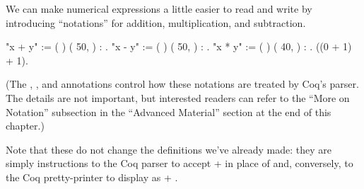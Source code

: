 \documentclass[12pt]{report}
\begin{document}
 We can make numerical expressions a little easier to read and
    write by introducing ``notations'' for addition, multiplication, and
    subtraction. \begin{coqdoccode}
\coqdocemptyline
\coqdocnoindent
{} "x + y" := (  )  \coqdoceol
\coqdocindent{11.50em}
(  50,  ) \coqdoceol
\coqdocindent{11.50em}
: .\coqdoceol
\coqdocnoindent
{} "x - y" := (  )  \coqdoceol
\coqdocindent{11.50em}
(  50,  ) \coqdoceol
\coqdocindent{11.50em}
: .\coqdoceol
\coqdocnoindent
{} "x * y" := (  )  \coqdoceol
\coqdocindent{11.50em}
(  40,  ) \coqdoceol
\coqdocindent{11.50em}
: .\coqdoceol
\coqdocemptyline
\coqdocnoindent
{} ((0 + 1) + 1).\coqdoceol
\coqdocemptyline
\end{coqdoccode}
(The , , and  annotations
   control how these notations are treated by Coq's parser.  The
   details are not important, but interested readers can refer to the
   ``More on Notation'' subsection in the ``Advanced Material'' section at
   the end of this chapter.) 

 Note that these do not change the definitions we've already
    made: they are simply instructions to the Coq parser to accept 
    +  in place of    and, conversely, to the Coq
    pretty-printer to display    as  + . 
\end{document}
